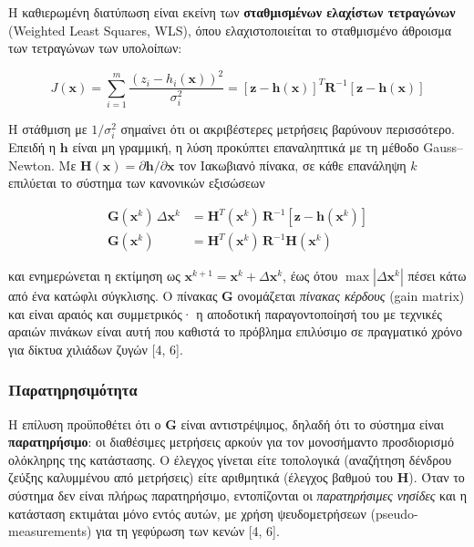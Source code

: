 Η καθιερωμένη διατύπωση είναι εκείνη των \textbf{σταθμισμένων ελαχίστων τετραγώνων} (Weighted Least
Squares, WLS), όπου ελαχιστοποιείται το σταθμισμένο άθροισμα των τετραγώνων των υπολοίπων:

\begin{equation}
J(\mathbf{x}) = \sum_{i=1}^{m} \frac{\left(z_i - h_i(\mathbf{x})\right)^2}{\sigma_i^2}
             = \left[\mathbf{z}-\mathbf{h}(\mathbf{x})\right]^{T} \mathbf{R}^{-1}
               \left[\mathbf{z}-\mathbf{h}(\mathbf{x})\right]
\label{eq:wls}
\end{equation}

Η στάθμιση με $1/\sigma_i^2$ σημαίνει ότι οι ακριβέστερες μετρήσεις βαρύνουν περισσότερο. Επειδή η
$\mathbf{h}$ είναι μη γραμμική, η λύση προκύπτει επαναληπτικά με τη μέθοδο Gauss--Newton. Με
$\mathbf{H}(\mathbf{x}) = \partial \mathbf{h}/\partial \mathbf{x}$ τον Ιακωβιανό πίνακα, σε κάθε
επανάληψη $k$ επιλύεται το σύστημα των κανονικών εξισώσεων

\begin{align}
\mathbf{G}(\mathbf{x}^{k}) \, \Delta \mathbf{x}^{k}
  &= \mathbf{H}^{T}(\mathbf{x}^{k}) \, \mathbf{R}^{-1}
     \left[\mathbf{z} - \mathbf{h}(\mathbf{x}^{k})\right] \\
\mathbf{G}(\mathbf{x}^{k})
  &= \mathbf{H}^{T}(\mathbf{x}^{k}) \, \mathbf{R}^{-1} \mathbf{H}(\mathbf{x}^{k})
\label{eq:gain}
\end{align}

και ενημερώνεται η εκτίμηση ως $\mathbf{x}^{k+1} = \mathbf{x}^{k} + \Delta \mathbf{x}^{k}$, έως
ότου $\max|\Delta \mathbf{x}^{k}|$ πέσει κάτω από ένα κατώφλι σύγκλισης. Ο πίνακας $\mathbf{G}$
ονομάζεται \emph{πίνακας κέρδους} (gain matrix) και είναι αραιός και συμμετρικός· η αποδοτική
παραγοντοποίησή του με τεχνικές αραιών πινάκων είναι αυτή που καθιστά το πρόβλημα επιλύσιμο σε
πραγματικό χρόνο για δίκτυα χιλιάδων ζυγών [4, 6].

\subsubsection*{Παρατηρησιμότητα}

Η επίλυση προϋποθέτει ότι ο $\mathbf{G}$ είναι αντιστρέψιμος, δηλαδή ότι το σύστημα είναι
\textbf{παρατηρήσιμο}: οι διαθέσιμες μετρήσεις αρκούν για τον μονοσήμαντο προσδιορισμό ολόκληρης
της κατάστασης. Ο έλεγχος γίνεται είτε τοπολογικά (αναζήτηση δένδρου ζεύξης καλυμμένου από
μετρήσεις) είτε αριθμητικά (έλεγχος βαθμού του $\mathbf{H}$). Όταν το σύστημα δεν είναι πλήρως
παρατηρήσιμο, εντοπίζονται οι \emph{παρατηρήσιμες νησίδες} και η κατάσταση εκτιμάται μόνο εντός
αυτών, με χρήση ψευδομετρήσεων (pseudo-measurements) για τη γεφύρωση των κενών [4, 6].

